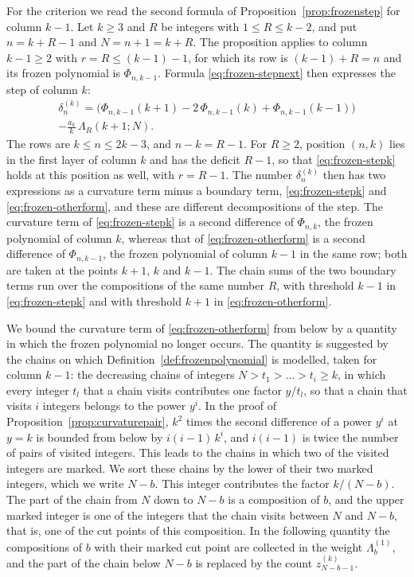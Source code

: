 \documentclass{amsart}
\theoremstyle{definition}
\theoremstyle{remark}
\numberwithin{equation}{section}
\begin{document}
For the criterion we read the second formula of
Proposition~\ref{prop:frozenstep} for column $k-1$. Let $k\ge3$ and $R$
be integers with $1\le R\le k-2$, and put $n=k+R-1$ and $N=n+1=k+R$. The
proposition applies to column $k-1\ge2$ with $r=R\le(k-1)-1$, for which
its row is $(k-1)+R=n$ and its frozen polynomial is $\Phi_{n,k-1}$. Formula
\eqref{eq:frozen-stepnext} then expresses the step of column $k$:
\begin{multline}\label{eq:frozen-otherform}
\delta^{(k)}_n=\bigl(\Phi_{n,k-1}(k+1)-2\,\Phi_{n,k-1}(k)+\Phi_{n,k-1}(k-1)\bigr)\\
-\frac{a_k}{k}\,\Lambda_R(k+1;N).
\end{multline}
The rows are $k\le n\le 2k-3$, and $n-k=R-1$. For $R\ge2$, position
$(n,k)$ lies in the first layer of column $k$ and has the deficit $R-1$,
so that \eqref{eq:frozen-stepk} holds at this position as well, with
$r=R-1$. The number $\delta^{(k)}_n$ then has two expressions as a curvature
term minus a boundary term, \eqref{eq:frozen-stepk} and
\eqref{eq:frozen-otherform}, and these are different decompositions of the
step. The curvature term of \eqref{eq:frozen-stepk} is a second difference
of $\Phi_{n,k}$, the frozen polynomial of column $k$, whereas that of
\eqref{eq:frozen-otherform} is a second difference of $\Phi_{n,k-1}$, the
frozen polynomial of column $k-1$ in the same row; both are taken at the
points $k+1$, $k$ and $k-1$. The chain sums of the two boundary terms run
over the compositions of the same number $R$, with threshold $k-1$ in
\eqref{eq:frozen-stepk} and with threshold $k+1$ in
\eqref{eq:frozen-otherform}.

We bound the curvature term of \eqref{eq:frozen-otherform} from below by a
quantity in which the frozen polynomial no longer occurs. The quantity is
suggested by the chains on which Definition~\ref{def:frozenpolynomial} is
modelled, taken for column $k-1$: the decreasing chains of integers
$N>t_1>\dots>t_i\ge k$, in which every integer $t_l$ that a chain visits
contributes one factor $y/t_l$, so that a chain that visits $i$ integers
belongs to the power $y^i$. In the proof of
Proposition~\ref{prop:curvaturepair}, $k^2$ times the second
difference of a power $y^i$ at $y=k$ is bounded from below by
$i(i-1)\,k^i$, and $i(i-1)$ is twice the number of pairs of visited
integers. This leads to the chains in which two of the visited integers are
marked. We sort these chains by
the lower of their two marked integers, which we write $N-b$. This integer
contributes the factor $k/(N-b)$. The part of the chain from $N$
down to $N-b$ is a composition of $b$, and the upper marked integer is one
of the integers that the chain visits between $N$ and $N-b$, that is, one
of the cut points of this composition. In the following quantity the
compositions of $b$ with their marked cut point are collected in the weight
$\Lambda^{(1)}_b$, and the part of the chain below $N-b$ is replaced by the
count $z^{(k)}_{N-b-1}$.
\end{document}
